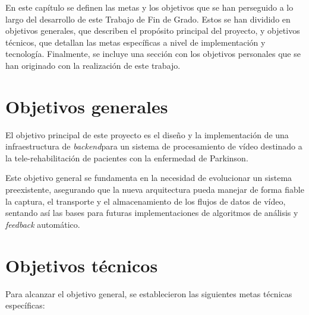 \label{objetivos}

En este capítulo se definen las metas y los objetivos que se han perseguido a lo largo del desarrollo de este Trabajo de Fin de Grado. Estos se han dividido en objetivos generales, que describen el propósito principal del proyecto, y objetivos técnicos, que detallan las metas específicas a nivel de implementación y tecnología. Finalmente, se incluye una sección con los objetivos personales que se han originado con la realización de este trabajo.

\section{Objetivos generales}

El objetivo principal de este proyecto es el diseño y la implementación de una infraestructura de \textit{backend}para un sistema de procesamiento de vídeo destinado a la tele-rehabilitación de pacientes con la enfermedad de Parkinson.

Este objetivo general se fundamenta en la necesidad de evolucionar un sistema preexistente, asegurando que la nueva arquitectura pueda manejar de forma fiable la captura, el transporte y el almacenamiento de los flujos de datos de vídeo, sentando así las bases para futuras implementaciones de algoritmos de análisis y \textit{feedback} automático.

\section{Objetivos técnicos}

Para alcanzar el objetivo general, se establecieron las siguientes metas técnicas específicas:

